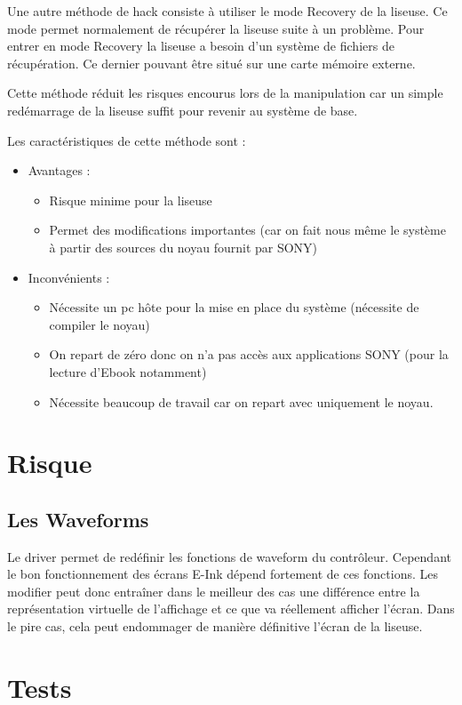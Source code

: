 Une autre méthode de hack consiste à utiliser le mode Recovery de la liseuse.
Ce mode permet normalement de récupérer la liseuse suite à un problème.
Pour entrer en mode Recovery la liseuse a besoin d'un système de fichiers de récupération.
Ce dernier pouvant être situé sur une carte mémoire externe.

Cette méthode réduit les risques encourus lors de la manipulation car un simple redémarrage de la liseuse 
suffit pour revenir au système de base.

Les caractéristiques de cette méthode sont  : 
\begin{itemize}
	\renewcommand{\labelitemi}{$\bullet$}
	\item Avantages : 
	\begin{itemize}
		\item Risque minime pour la liseuse
		\item Permet des modifications importantes (car on fait nous même le système à partir des sources du noyau fournit par SONY)%
	\end{itemize}
	\item Inconvénients : 
		\begin{itemize}
			\item Nécessite un pc hôte pour la mise en place du système (nécessite de compiler le noyau)
			\item On repart de zéro donc on n'a pas accès aux applications SONY (pour la lecture d'Ebook notamment)
			\item Nécessite beaucoup de travail car on repart avec uniquement le noyau.
		\end{itemize}
\end{itemize}
\section{Risque}
\subsection{Les Waveforms}
	Le driver permet de redéfinir les fonctions de waveform du contrôleur.
Cependant le bon fonctionnement des écrans E-Ink dépend fortement de ces fonctions. Les modifier peut donc entraîner dans le meilleur des cas une différence entre la représentation virtuelle de l'affichage et ce que va réellement afficher l'écran. Dans le pire cas, cela peut endommager de manière définitive l'écran de la liseuse.

\section{Tests}

